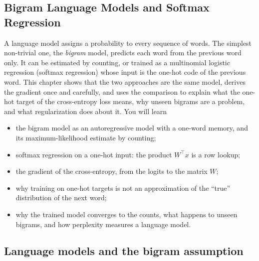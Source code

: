 \begin{notechapter}
\chapter{Bigram Language Models and Softmax Regression}\label{ch:bigram-models}

\begin{chapterintro}
A language model assigns a probability to every sequence of words. The simplest
non-trivial one, the \emph{bigram} model, predicts each word from the previous word only.
It can be estimated by counting, or trained as a multinomial logistic regression (softmax
regression) whose input is the one-hot code of the previous word. This chapter shows that
the two approaches are the same model, derives the gradient once and carefully, and
uses the comparison to explain what the one-hot target of the cross-entropy loss means,
why unseen bigrams are a problem, and what regularization does about it. You will learn
\begin{itemize}[nosep]
  \item the bigram model as an autoregressive model with a one-word memory, and its
        maximum-likelihood estimate by counting;
  \item softmax regression on a one-hot input: the product $W^\top x$ is a row lookup;
  \item the gradient of the cross-entropy, from the logits to the matrix $W$;
  \item why training on one-hot targets is not an approximation of the ``true''
        distribution of the next word;
  \item why the trained model converges to the counts, what happens to unseen bigrams, and
        how perplexity measures a language model.
\end{itemize}
\end{chapterintro}

\section{Language models and the bigram assumption}\label{bigram-models:sec:bigram}


\end{notechapter}

